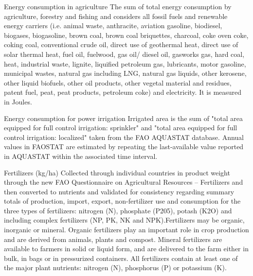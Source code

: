 \begin{MetadataCollection} {}
\begin{metadata}{Energy consumption in agriculture} {}
The sum of total energy consumption by agriculture, forestry and fishing and considers all fossil fuels and renewable energy carriers (i.e. animal waste, anthracite, aviation gasoline, biodiesel, biogases, biogasoline, brown coal, brown coal briquettes, charcoal, coke oven coke, coking coal, conventional crude oil, direct use of geothermal heat, direct use of solar thermal heat, fuel oil, fuelwood, gas oil/ diesel oil, gasworks gas, hard coal, heat, industrial waste, lignite, liquified petroleum gas, lubricants, motor gasoline, municipal wastes, natural gas including LNG, natural gas liquids, other kerosene, other liquid biofuels, other oil products, other vegetal material and residues, patent fuel, peat, peat products, petroleum coke) and electricity. It is measured in Joules.
\end{metadata}
 
 
\begin{metadata}{Energy consumption for power irrigation} {}
Irrigated area is the sum of "total area equipped for full control irrigation: sprinkler" and "total area equipped for full control irrigation: localized" taken from the FAO AQUASTAT database. Annual values in FAOSTAT are estimated by repeating the last-available value reported in AQUASTAT within the associated time interval.
\end{metadata}


\begin{metadata}{Fertilizers (kg/ha)} {}
Collected through individual countries in product weight through the new FAO Questionnaire on Agricultural Resources – Fertilizers and then converted to nutrients and validated for consistency regarding summary totals of production, import, export, non-fertilizer use and consumption for the three types of fertilizers: nitrogen (N), phosphate (P205), potash (K2O) and including complex fertilizers (NP, PK, NK and NPK).Fertilizers may be organic, inorganic or mineral. Organic fertilizers play an important role in crop production and are derived from animals, plants and compost. Mineral fertilizers are available to farmers in solid or liquid form, and are delivered to the farm either in bulk, in bags or in pressurized containers. All fertilizers contain at least one of the major plant nutrients: nitrogen (N), phosphorus (P) or potassium (K).
\end{metadata}


\end{MetadataCollection}
